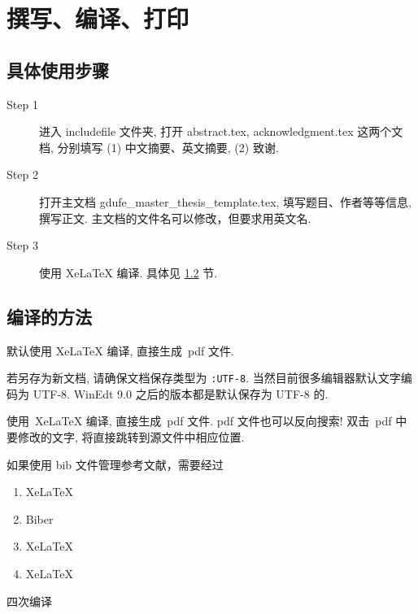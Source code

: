 \setlength{\baselineskip}{20pt} \selectfont
\chapter{撰写、编译、打印\the\baselineskip}
\the\baselineskip
\section{具体使用步骤\the\baselineskip}
\the\baselineskip
\begin{description}

    \item[Step 1]  进入 includefile 文件夹,  打开 abstract.tex, acknowledgment.tex 这两个文档, 分别填写 (1) 中文摘要、英文摘要, (2) 致谢.\the\baselineskip

    \item[Step 2]  打开主文档 gdufe\_master\_thesis\_template.tex, 填写题目、作者等等信息, 撰写正文. 主文档的文件名可以修改，但要求用英文名.

    \item[Step 3]  使用 XeLaTeX 编译. 具体见 \ref{sec-compile} 节.

\end{description}

\section{编译的方法}\label{sec-compile}

默认使用 XeLaTeX 编译, 直接生成~pdf 文件. \the\baselineskip

若另存为新文档, 请确保文档保存类型为 \verb|:UTF-8|. 当然目前很多编辑器默认文字编码为 UTF-8.
WinEdt 9.0 之后的版本都是默认保存为 UTF-8 的. \the\baselineskip

使用~XeLaTeX 编译, 直接生成~pdf 文件.
pdf 文件也可以反向搜索! 双击~pdf 中要修改的文字, 将直接跳转到源文件中相应位置.

如果使用 bib 文件管理参考文献，需要经过
\begin{enumerate}
    \item XeLaTeX

    \item Biber

    \item XeLaTeX

    \item XeLaTeX
\end{enumerate}
四次编译 \the\baselineskip


